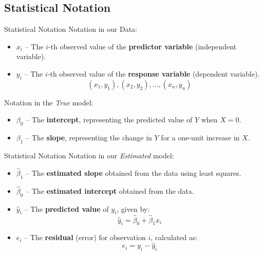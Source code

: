\documentclass[aspectratio=169,xcolor=dvipsnames]{beamer}
\begin{document}
\subsection{Statistical Notation}
\begin{frame}{Statistical Notation}
Notation in our Data:
    \begin{itemize}
        \item \textbf{\( x_i \)} – The \( i \)-th observed value of the \textbf{predictor variable} (independent variable).
        \item \textbf{\( y_i \)} – The \( i \)-th observed value of the \textbf{response variable} (dependent variable).
        $$ (x_1, y_1), (x_2, y_2), ..., (x_n, y_n)$$
    \end{itemize}
    Notation in the \textit{True} model:
    \begin{itemize}
        \item \textbf{\( \beta_0 \)} – The \textbf{intercept}, representing the predicted value of \( Y \) when \( X = 0 \).
        \item \textbf{\( \beta_1 \)} – The \textbf{slope}, representing the change in \( Y \) for a one-unit increase in \( X \).
    \end{itemize}
\end{frame}


\begin{frame}{Statistical Notation}
Notation in our \textit{Estimated} model:
    \begin{itemize}
        \item \textbf{\( \hat{\beta}_1 \)} – The \textbf{estimated slope} obtained from the data using least squares.
        \item \textbf{\( \hat{\beta}_0 \)} – The \textbf{estimated intercept} obtained from the data.
        \item \textbf{\( \hat{y}_i \)} – The \textbf{predicted value} of \( y_i \), given by:
        \begin{equation}
            \hat{y}_i = \hat{\beta}_0 + \hat{\beta}_1 x_i
        \end{equation}
        \item \textbf{\( e_i \)} – The \textbf{residual} (error) for observation \( i \), calculated as:
        \begin{equation}
            e_i = y_i - \hat{y}_i
        \end{equation}
    \end{itemize}
\end{frame}
\end{document}
